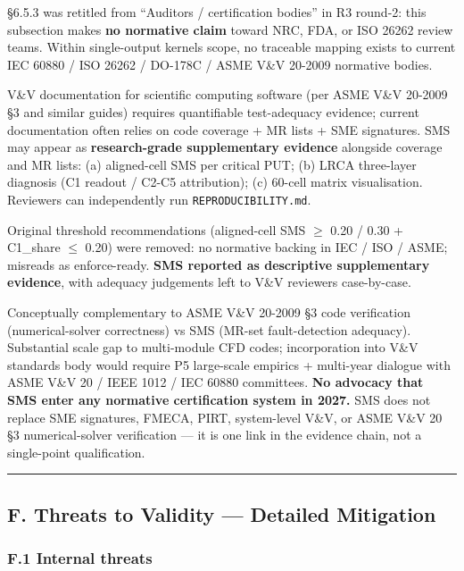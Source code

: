\documentclass[review,12pt,authoryear]{elsarticle}
\begin{document}
§6.5.3 was retitled from ``Auditors / certification bodies'' in R3
round-2: this subsection makes \textbf{no normative claim} toward NRC,
FDA, or ISO 26262 review teams. Within single-output kernels scope, no
traceable mapping exists to current IEC 60880 / ISO 26262 / DO-178C /
ASME V\&V 20-2009 normative bodies.

V\&V documentation for scientific computing software (per ASME V\&V
20-2009 §3 and similar guides) requires quantifiable test-adequacy
evidence; current documentation often relies on code coverage + MR lists
+ SME signatures. SMS may appear as \textbf{research-grade supplementary
evidence} alongside coverage and MR lists: (a) aligned-cell SMS per
critical PUT; (b) LRCA three-layer diagnosis (C1 readout / C2-C5
attribution); (c) 60-cell matrix visualisation. Reviewers can
independently run \texttt{REPRODUCIBILITY.md}.

Original threshold recommendations (aligned-cell SMS $\geq$ 0.20 / 0.30 +
C1\_share $\leq$ 0.20) were removed: no normative backing in IEC / ISO /
ASME; misreads as enforce-ready. \textbf{SMS reported as descriptive
supplementary evidence}, with adequacy judgements left to V\&V reviewers
case-by-case.

Conceptually complementary to ASME V\&V 20-2009 §3 code verification
(numerical-solver correctness) vs SMS (MR-set fault-detection adequacy).
Substantial scale gap to multi-module CFD codes; incorporation into V\&V
standards body would require P5 large-scale empirics + multi-year
dialogue with ASME V\&V 20 / IEEE 1012 / IEC 60880 committees.
\textbf{No advocacy that SMS enter any normative certification system in
2027.} SMS does not replace SME signatures, FMECA, PIRT, system-level
V\&V, or ASME V\&V 20 §3 numerical-solver verification --- it is one
link in the evidence chain, not a single-point qualification.

\begin{center}\rule{0.5\linewidth}{0.5pt}\end{center}

\subsection{F. Threats to Validity --- Detailed
Mitigation}\label{f.-threats-to-validity-detailed-mitigation}

\subsubsection{F.1 Internal threats}\label{f.1-internal-threats}
\end{document}
